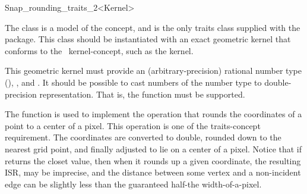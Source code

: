 
\ccRefPageBegin


\begin {ccRefClass} {Snap_rounding_traits_2<Kernel>}
    

The class  is a model of the
 concept, and is the only traits class supplied
with the package.
This class should be instantiated with an exact geometric kernel that conforms
to the \cgal\ kernel-concept, such as the
 kernel.

This geometric kernel must provide an (arbitrary-precision) rational number type
(), ,  and .
It should be possible to cast numbers of the number type  to 
double-precision representation. That is, the function 
 must be supported.

The  function is used to implement the operation that
rounds the coordinates of a point to a center of a pixel. This operation is one
of the traits-concept requirement. The coordinates are converted to double, 
rounded down to the nearest grid point, and finally adjusted to lie on a center
of a pixel. Notice that if
 returns the closet value, then when it rounds up a given
coordinate, the resulting ISR, may be imprecise, and the distance between some
vertex and a non-incident edge can be slightly less than the guaranteed
half-the width-of-a-pixel.


 
\ccIsModel
    \\
 
\end{ccRefClass} %
\ccRefPageEnd
